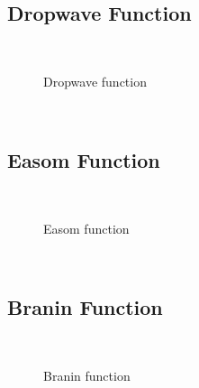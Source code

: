 \subsection{Dropwave Function}
~
\begin{figure}[ht]
	\centering
	\setlength \fboxsep{0pt}
	\setlength \fboxrule{0.5pt}
	\caption{Dropwave function}
	\label{fig:DropwaveGraph}
\end{figure}
~
\subsection{Easom Function}
~
\begin{figure}[ht]
	\centering
	\setlength \fboxsep{0pt}
	\setlength \fboxrule{0.5pt}
	\caption{Easom function}
	\label{fig:EasomGraph}
\end{figure}
~
\subsection{Branin Function}
~
\begin{figure}[ht]
	\centering
	\setlength \fboxsep{0pt}
	\setlength \fboxrule{0.5pt}
	\caption{Branin function}
	\label{fig:BraninGraph}
\end{figure}
~
